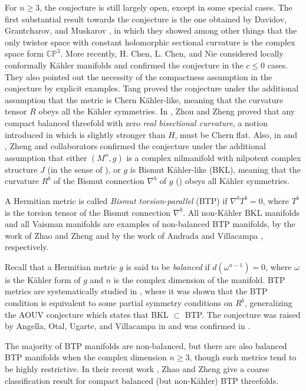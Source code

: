 \documentclass{amsart}
\begin{document}
For $n\geq 3$, the conjecture is still largely open, except in some special cases. The first substantial result towards the conjecture is the one obtained by Davidov, Grantcharov, and Muskarov \cite{DGM}, in which they showed among other things that the only twistor space with constant holomorphic sectional curvature is the complex space form ${\mathbb C}{\mathbb P}^3$. More recently, H. Chen, L. Chen, and Nie \cite{CCN} considered locally conformally K\"ahler manifolds and confirmed the conjecture in the $c\leq 0$ cases. They also pointed out the necessity of the compactness assumption in the conjecture by explicit examples. Tang \cite{Tang} proved the conjecture under the additional assumption that the metric is Chern K\"ahler-like, meaning that the curvature tensor $R$ obeys all the K\"ahler symmetries. In \cite{ZhouZ}, Zhou and Zheng proved that any compact balanced threefold with zero {\em real bisectional curvature}, a notion introduced in \cite{XYangZ} which is slightly stronger than $H$, must be Chern flat. Also, in \cite{LZ} and \cite{RZ}, Zheng and collaborators confirmed the conjecture under the additional assumption that either $(M^n,g)$ is a complex nilmanifold with nilpotent complex structure $J$ (in the sense of \cite{CFGU}), or $g$ is Bismut K\"ahler-like (BKL), meaning that the curvature $R^b$ of the Bismut connection $\nabla^b$ of $g$ (\cite{Bismut}) obeys all K\"ahler symmetries.

A Hermitian metric is called {\em Bismut torsion-parallel} (BTP) if $\nabla^bT^b=0$, where $T^b$ is the torsion tensor of the Bismut connection $\nabla^b$. All non-K\"ahler BKL manifolds and all Vaisman manifolds are examples of non-balanced BTP manifolds, by the work of Zhao and Zheng \cite{ZZCrelle} and   by the work of Andrada and Villacampa \cite{AndradaV}, respectively.

Recall that a Hermitian metric $g$ is said to be {\em balanced} if $d(\omega^{n-1})=0$, where $\omega$ is the K\"ahler form of $g$ and $n$ is the complex dimension of the manifold. BTP metrics are systematically studied in \cite{ZhaoZ24}, where it was shown that the BTP condition is equivalent to some partial symmetry conditions on $R^b$, generalizing the AOUV conjecture which states that BKL $\subset$ BTP. The conjecture was raised by Angella, Otal, Ugarte, and Villacampa in \cite{AOUV} and was confirmed in \cite{ZZCrelle}.

The majority of BTP manifolds are non-balanced, but there are also balanced BTP manifolds when the complex dimension $n\geq 3$, though such metrics tend to be highly restrictive. In their recent work \cite{ZhaoZ25}, Zhao and Zheng give a coarse classification result for compact balanced (but non-K\"ahler) BTP threefolds.
\end{document}
